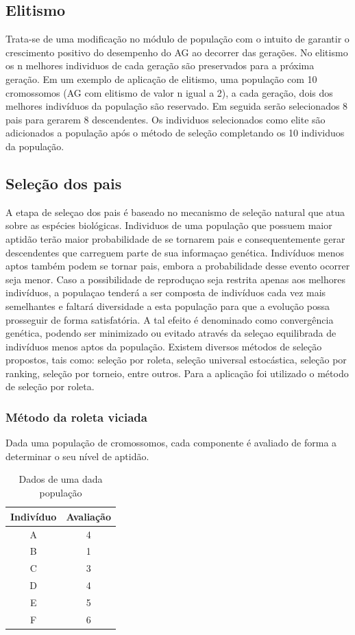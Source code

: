 \documentclass[twoside]{article}
\begin{document}
\begin{multicols}{2}
\subsection{Elitismo}
Trata-se de uma modificação no módulo de população com o intuito de garantir o crescimento positivo do desempenho do AG ao decorrer das gerações. No elitismo os n melhores individuos de cada geração são preservados para a próxima geração.  Em um exemplo de aplicação de elitismo, uma população com 10 cromossomos (AG com elitismo de valor n igual a 2), a cada geração, dois dos melhores indivíduos da população são reservado. Em seguida serão selecionados 8 pais para gerarem 8 descendentes. Os individuos selecionados como elite são adicionados a população após o método de seleção completando os 10 individuos da população.

\subsection{Seleção dos pais}
A etapa de seleçao dos pais é baseado no mecanismo de seleção natural que atua sobre as espécies biológicas. Individuos de uma população que possuem maior aptidão terão maior probabilidade de se tornarem pais e consequentemente gerar descendentes que carreguem parte de sua informaçao genética. Indivíduos menos aptos também podem se tornar pais, embora a probabilidade desse evento ocorrer seja menor. Caso a possibilidade de reproduçao seja restrita apenas aos melhores indivíduos, a populaçao tenderá a ser composta de indivíduos cada vez mais semelhantes e faltará diversidade a esta população para que a evolução possa prosseguir de forma satisfatória. A tal efeito é denominado como convergência genética, podendo ser minimizado ou evitado através da seleçao equilibrada de indivíduos menos aptos da população. Existem diversos métodos de seleção propostos, tais como: seleção por roleta, seleção universal estocástica, seleção por ranking, seleção por torneio, entre outros. Para a aplicação foi utilizado o método de seleção por roleta.

\subsubsection{Método da roleta viciada}
Dada uma população de cromossomos, cada componente é avaliado de forma a determinar o seu nível de aptidão. 
\begin{table}[H]
\caption{Dados de uma dada população}
\centering
\begin{tabular}{cc}
\toprule
Indivíduo & Avaliação \\
\midrule
A & 4\\
B & 1\\
C & 3\\
D & 4\\
E & 5\\
F & 6\\
\bottomrule
\end{tabular}
\end{table}


\end{multicols}
\end{document}
